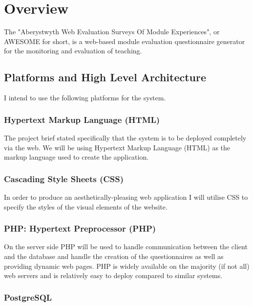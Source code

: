 \documentclass[11pt,a4paper]{article}
\begin{document}
\clearpage

\section{Overview}

The "Aberystwyth Web Evaluation Surveys Of Module Experiences", or AWESOME for short, is a web-based module evaluation questionnaire generator for the monitoring and evaluation of teaching.

\subsection{Platforms and High Level Architecture}

I intend to use the following platforms for the system.

\subsubsection{Hypertext Markup Language (HTML)}

The project brief stated specifically that the system is to be deployed completely via the web. We will be using  Hypertext Markup Language (HTML) as the markup language used to create the application.

\subsubsection{Cascading Style Sheets (CSS)}

In order to produce an aesthetically-pleasing web application I will utilise CSS to specify the styles of the visual elements of the website.

\subsubsection{PHP: Hypertext Preprocessor (PHP)}

On the server side PHP will be used to handle communication between the client and the database and handle the creation of the questionnaires as well as providing dynamic web pages. PHP is widely available on the majority (if not all) web servers and is relatively easy to deploy compared to similar systems.

\subsubsection{PostgreSQL}
\end{document}
